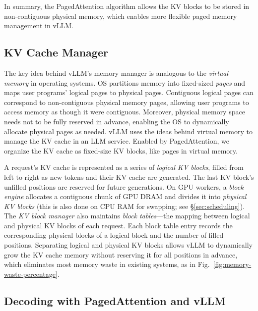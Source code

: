 In summary, the PagedAttention algorithm allows the KV blocks to be stored in non-contiguous physical memory, which enables more flexible paged memory management in vLLM.

\subsection{KV Cache Manager}
\label{sec:block-space-manager}

The key idea behind vLLM's memory manager is analogous to the \emph{virtual memory} \cite{kilburn1962one} in operating systems. OS partitions memory into fixed-sized \emph{pages} and maps user programs' logical pages to physical pages. Contiguous logical pages can correspond to non-contiguous physical memory pages, allowing user programs to access memory as though it were contiguous. Moreover, physical memory space needs not to be fully reserved in advance, enabling the OS to dynamically allocate physical pages as needed. vLLM uses the ideas behind virtual memory to manage the KV cache in an LLM service. Enabled by PagedAttention, we organize the KV cache as fixed-size KV blocks, like pages in virtual memory. 

A request's KV cache is represented as a series of \emph{logical KV blocks}, filled from left to right as new tokens and their KV cache are generated. The last KV block's unfilled positions are reserved for future generations. On GPU workers, a \emph{block engine} allocates a contiguous chunk of GPU DRAM and divides it into \emph{physical KV blocks} (this is also done on CPU RAM for swapping; see \S\ref{sec:scheduling}). The \emph{KV block manager} also maintains \emph{block tables}---the mapping between logical and physical KV blocks of each request. Each block table entry records the corresponding physical blocks of a logical block and the number of filled positions. Separating logical and physical KV blocks allows vLLM to dynamically grow the KV cache memory without reserving it for all positions in advance, which eliminates most memory waste in existing systems, as in Fig.~\ref{fig:memory-waste-percentage}. 

\subsection{Decoding with PagedAttention and vLLM}
\label{sec:one-sequence-decoding-example}

